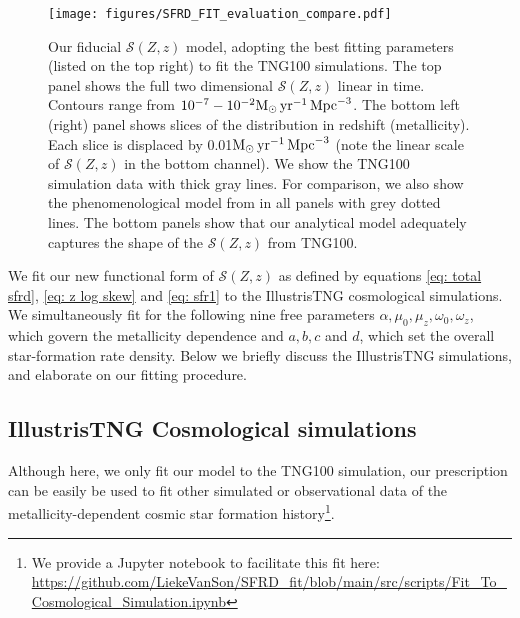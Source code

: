 \documentclass[twocolumn]{aastex631}
\newcommand{\Msun}{\ensuremath{\rm{M}_{\odot}}\xspace}
\newcommand{\yr}{\ensuremath{\,\rm{yr}}\xspace}
\newcommand{\Mpc}{\ensuremath{\,\rm{Mpc}}\xspace}
\newcommand{\SFRDzZ}{\ensuremath{\mathcal{S}(Z,z)}\xspace}
\begin{document}
\begin{figure*}
\centering
{}
\texttt{[image: figures/SFRD\_FIT\_evaluation\_compare.pdf]}
\caption{Our fiducial \SFRDzZ model, adopting the best fitting parameters (listed on the top right) to fit the TNG100 simulations. The top panel shows the full two dimensional \SFRDzZ linear in time. Contours range from $10^{-7} - 10^{-2} \Msun \yr^{-1}\Mpc^{-3}$. 
The bottom left (right) panel shows slices of the distribution in redshift (metallicity). Each slice is displaced by 0.01$\Msun \yr^{-1}\Mpc^{-3}$ (note the linear scale of \SFRDzZ in the bottom channel). We show the TNG100 simulation data with thick gray lines. 
For comparison, we also show the phenomenological model from \protect\cite{Neijssel+2019} in all panels with grey dotted lines. The bottom panels show that our analytical model adequately captures the shape of the \SFRDzZ from TNG100.
 \label{fig: fit SFRD}}
\end{figure*}
We fit our new functional form of \SFRDzZ as defined by equations \ref{eq: total sfrd}, \ref{eq: z log skew} and \ref{eq: sfr1} to the IllustrisTNG cosmological simulations. 
We simultaneously fit for the following nine free parameters $\alpha, \mu_0, \mu_z, \omega_0, \omega_z$, which govern the metallicity dependence and $a,b, c$ and $d$, which set the overall star-formation rate density.
Below we briefly discuss the IllustrisTNG simulations, and elaborate on our fitting procedure.




\subsection{IllustrisTNG Cosmological simulations}
%
Although here, we only fit our model to the TNG100 simulation, our prescription can be easily be used to fit other simulated or observational data of the metallicity-dependent cosmic star formation history\footnote{We provide a Jupyter notebook to facilitate this fit here: \url{https://github.com/LiekeVanSon/SFRD_fit/blob/main/src/scripts/Fit_To_Cosmological_Simulation.ipynb} }.
\end{document}

